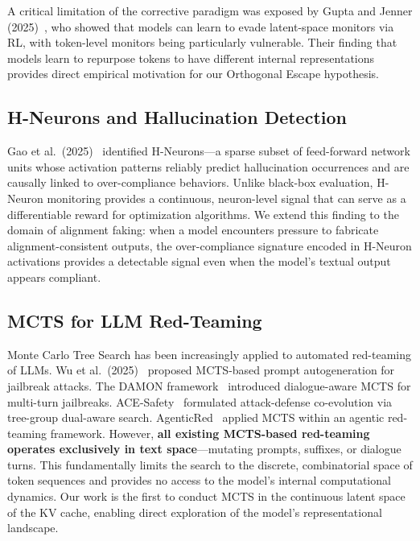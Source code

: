 \documentclass[10pt]{article}
\begin{document}
A critical limitation of the corrective paradigm was exposed by Gupta and Jenner (2025)~\cite{gupta2025rlobfuscation}, who showed that models can learn to evade latent-space monitors via RL, with token-level monitors being particularly vulnerable. Their finding that models learn to repurpose tokens to have different internal representations provides direct empirical motivation for our Orthogonal Escape hypothesis.

\subsection{H-Neurons and Hallucination Detection}


Gao et al.\ (2025)~\cite{gao2025hneurons} identified H-Neurons---a sparse subset of feed-forward network units whose activation patterns reliably predict hallucination occurrences and are causally linked to over-compliance behaviors. Unlike black-box evaluation, H-Neuron monitoring provides a continuous, neuron-level signal that can serve as a differentiable reward for optimization algorithms. We extend this finding to the domain of alignment faking: when a model encounters pressure to fabricate alignment-consistent outputs, the over-compliance signature encoded in H-Neuron activations provides a detectable signal even when the model's textual output appears compliant.

\subsection{MCTS for LLM Red-Teaming}


Monte Carlo Tree Search has been increasingly applied to automated red-teaming of LLMs. Wu et al.\ (2025)~\cite{wu2025mcts} proposed MCTS-based prompt autogeneration for jailbreak attacks. The DAMON framework~\cite{damon2025} introduced dialogue-aware MCTS for multi-turn jailbreaks. ACE-Safety~\cite{li2025ace} formulated attack-defense co-evolution via tree-group dual-aware search. AgenticRed~\cite{agenticred2025} applied MCTS within an agentic red-teaming framework. However, \textbf{all existing MCTS-based red-teaming operates exclusively in text space}---mutating prompts, suffixes, or dialogue turns. This fundamentally limits the search to the discrete, combinatorial space of token sequences and provides no access to the model's internal computational dynamics. Our work is the first to conduct MCTS in the continuous latent space of the KV cache, enabling direct exploration of the model's representational landscape.
\end{document}
